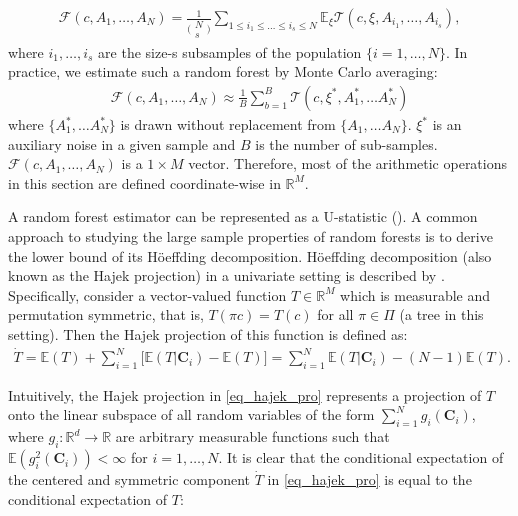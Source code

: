 \documentclass[12pt]{article}
\begin{document}
\begin{align}\label{eq_rf}
    \mathcal{F}(c, A_1, \dots, A_N) = \frac{1}{\big(\begin{smallmatrix} N \\ s \end{smallmatrix}\big)}\sum_{1 \leq i_1 \leq  \dots \leq i_s \leq N} \mathbb{E}_{\xi}\mathcal{T}(c, \xi, A_{i_1}, \dots, A_{i_s}),
\end{align}
where $i_1, \dots, i_s$ are the size-s subsamples of the population $\{i = 1, \dots, N\}$. In practice, we estimate such a random forest by Monte Carlo averaging:
\begin{align}
 \mathcal{F}(c, A_1, \dots, A_N) \approx \frac{1}{B}\sum_{b=1}^{B}\mathcal{T}(c, \xi^*,  A^*_{1}, \dots A^*_{N})
\end{align}
where $\{A^*_{1}, \dots A^*_{N}\}$ is drawn without replacement from  $\{A_{1}, \dots A_{N}\}$. $\xi^*$ is an auxiliary noise in a given sample and $B$ is the number of sub-samples. $\mathcal{F}(c, A_1, \dots, A_N)$ is a $1 \times M$ vector. Therefore, most of the arithmetic operations in this section are defined coordinate-wise in $\mathbb{R}^M$. 


A random forest estimator can be represented as a U-statistic (\citealp{hoeffding1961strong, korolyuk2013theory}). A common approach to studying the large sample properties of random forests is to derive the lower bound of its Höeffding decomposition. Höeffding decomposition (also known as the Hajek projection) in a univariate setting is described by  \cite{hajek1968asymptotic}. Specifically, consider a vector-valued function $T \in \mathbb{R}^M$ which is measurable and permutation symmetric, that is,  $T(\pi c) = T(c)$ for all $\pi \in \Pi$ (a tree in this setting). Then the Hajek projection of this function is defined as:
\begin{align}\label{eq_hajek_pro}
    \dot{T} = \mathbb{E}(T) + \sum_{i=1}^N \big[\mathbb{E}(T|\mathbf{C}_i) - \mathbb{E}(T)\big] = \sum_{i= 1}^N\mathbb{E}(T|\mathbf{C}_i) - (N-1)\mathbb{E}(T). 
\end{align}

Intuitively, the Hajek projection in \eqref{eq_hajek_pro} represents a projection of $T$ onto the linear subspace of all random variables of the form $\sum_{i=1}^Ng_i(\mathbf{C}_i)$, where $g_i: \mathbb{R}^d \rightarrow \mathbb{R}$ are arbitrary measurable functions such that $\mathbb{E}(g_i^2(\mathbf{C}_i)) < \infty$ for $i = 1, \dots, N$. It is clear that the conditional expectation of the centered and symmetric component $\dot{T}$ in \eqref{eq_hajek_pro} is equal to the conditional expectation of $T$:
\end{document}
